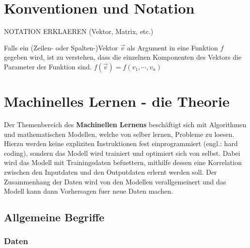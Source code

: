 \documentclass[../main]{subfiles}
\begin{document}
\section{Konventionen und Notation}

NOTATION ERKLAEREN (Vektor, Matrix, etc.)
\par\bigskip
Falls ein (Zeilen- oder Spalten-)Vektor $\vec{v}$ als Argument in eine Funktion $f$ gegeben wird, ist zu verstehen,
dass die einzelnen Komponenten des Vektors die Parameter der Funktion sind.
$f(\vec{v})=f(v_1,\cdots,v_n)$

\section{Machinelles Lernen - die Theorie}

Der Themenbereich des \textbf{Machinellen Lernens} beschäftigt sich mit Algorithmen und mathematischen Modellen, welche von selber lernen, Probleme zu loesen.
Hierzu werden keine expliziten Instruktionen fest einprogrammiert (engl.: hard coding), sondern das Modell wird trainiert und optimiert sich von selbst.
Dabei wird das Modell mit Trainingsdaten befuettern, mithilfe dessen eine Korrelation zwischen den Inputdaten und den Outputdaten erlernt werden soll.
Der Zusammenhang der Daten wird von den Modellen verallgemeinert und das Modell kann dann Vorhersagen fuer neue Daten machen. 

\subsection{Allgemeine Begriffe}

\subsubsection{Daten}
\end{document}
